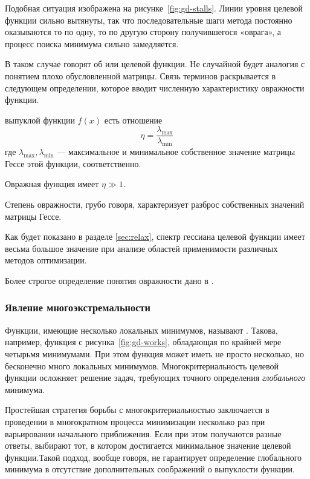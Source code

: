 Подобная ситуация изображена на рисунке \ref{fig:gd-stalls}. Линии
уровня целевой функции сильно вытянуты, так что последовательные шаги
метода \gd{} постоянно оказываются то по одну, то по другую сторону
получившегося «оврага», а процесс поиска минимума сильно замедляется.

В таком случае говорят об  или  целевой функции. Не случайной будет аналогия с
понятием плохо обусловленной матрицы. Связь терминов раскрывается в
следующем определении, которое вводит численную характеристику
овражности функции.

\begin{dfn}
  \label{dfn:gully}
   выпуклой функции $f(x)$ есть отношение
  \begin{equation}
    \eta = \frac{\lambda_{\max}}{\lambda_{\min}}
  \end{equation}
  где $\lambda_{\max}, \lambda_{\min}$ — максимальное и минимальное
  собственное значение матрицы Гессе этой функции, соответственно.
\end{dfn}

Овражная функция имеет $\eta \gg 1$.

Степень овражности, грубо говоря, характеризует разброс собственных
значений матрицы Гессе. 

Как будет показано в разделе \ref{sec:relax}, спектр гессиана целевой
функции имеет весьма большое значение при анализе областей
применимости различных методов оптимизации.

Более строгое определение понятия овражности дано в
\cite{chernorutsky04}.

\subsubsection{Явление многоэкстремальности}
\label{sec:problems-multiextr}

Функции, имеющие несколько локальных минимумов, называют
. Такова, например, функция с
рисунка \ref{fig:gd-works}, обладающая по крайней мере четырьмя
минимумами. При этом функция может иметь не просто несколько, но
бесконечно много локальных минимумов. Многокритериальность целевой
функции осложняет решение задач, требующих точного определения
\emph{глобального} минимума.

Простейшая стратегия борьбы с многокритериальностью заключается в
проведении в многократном процесса минимизации несколько раз при
варьировании начального приближения. Если при этом получаются разные
ответы, выбирают тот, в котором достигается минимальное значение
целевой функции.Такой подход, вообще говоря, не гарантирует
определение глобального минимума в отсутствие дополнительных
соображений о выпуклости функции.
